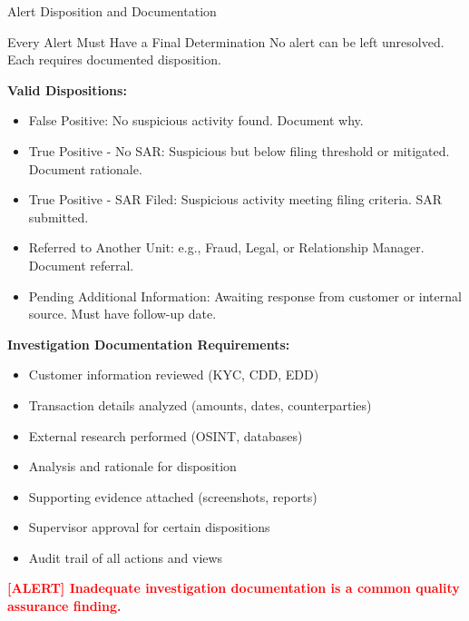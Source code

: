 \documentclass[11pt,a4paper]{beamer}
\newcommand{\redflag}[1]{\textcolor{red}{\textbf{[ALERT] #1}}}
\begin{document}
	\begin{frame}{Alert Disposition and Documentation}
	\begin{block}{Every Alert Must Have a Final Determination}
		No alert can be left unresolved. Each requires documented disposition.
	\end{block}
	
	\textbf{Valid Dispositions:}
	\begin{itemize}
		\item False Positive: No suspicious activity found. Document why.
		\item True Positive - No SAR: Suspicious but below filing threshold or mitigated. Document rationale.
		\item True Positive - SAR Filed: Suspicious activity meeting filing criteria. SAR submitted.
		\item Referred to Another Unit: e.g., Fraud, Legal, or Relationship Manager. Document referral.
		\item Pending Additional Information: Awaiting response from customer or internal source. Must have follow-up date.
	\end{itemize}
	
	\textbf{Investigation Documentation Requirements:}
	\begin{itemize}
		\item Customer information reviewed (KYC, CDD, EDD)
		\item Transaction details analyzed (amounts, dates, counterparties)
		\item External research performed (OSINT, databases)
		\item Analysis and rationale for disposition
		\item Supporting evidence attached (screenshots, reports)
		\item Supervisor approval for certain dispositions
		\item Audit trail of all actions and views
	\end{itemize}
	
	\redflag{Inadequate investigation documentation is a common quality assurance finding.}
	\end{frame}
	
\end{document}
